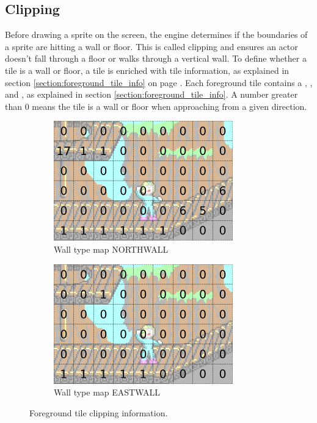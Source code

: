 \documentclass[book.tex]{subfiles}
\begin{document}
\subsection{Clipping}
\label{section:clipping}
Before drawing a sprite on the screen, the engine determines if the boundaries of a sprite are hitting a wall or floor. This is called clipping and ensures an actor doesn't fall through a floor or walks through a vertical wall. To define whether a tile is a wall or floor, a tile is enriched with tile information, as explained in section \ref{section:foreground_tile_info} on page \pageref{section:foreground_tile_info}. Each foreground tile contains a , ,  and , as explained in section \ref{section:foreground_tile_info}. A number greater than 0 means the tile is a wall or floor when approaching from a given direction. 

\begin{figure}[H]
\centering
\begin{subfigure}{.5\textwidth}
  \centering
  \includegraphics[width=.9\textwidth]{screenshots_300dpi/game/clip_tinf_1.png}
  \caption{Wall type map NORTHWALL}
  \label{fig:clip_tinf_n}
\end{subfigure}%
\begin{subfigure}{.5\textwidth}
  \centering
  \includegraphics[width=.9\textwidth]{screenshots_300dpi/game/clip_tinf_east.png}
  \caption{Wall type map EASTWALL}
  \label{fig:clip_tinf_e}
\end{subfigure}
\caption{Foreground tile clipping information.}
\label{fig:clip_tinf}
\end{figure}
\end{document}
